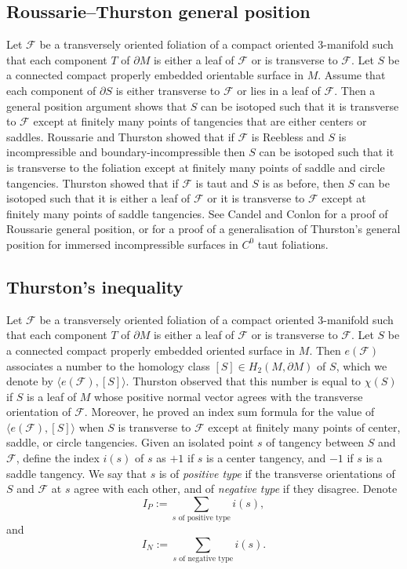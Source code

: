 \documentclass[11pt]{amsart}
\theoremstyle{remark}
\theoremstyle{definition}
\begin{document}
	\subsection{Roussarie--Thurston general position}
	Let $\mathcal{F}$ be a transversely oriented foliation of a compact oriented 3-manifold such that each component $T$ of $\partial M$ is either a leaf of $\mathcal{F}$ or is transverse to $\mathcal{F}$. Let $S$ be a connected compact properly embedded orientable surface in $M$. Assume that each component of $\partial S$ is either transverse to $\mathcal{F}$ or lies in a leaf of $\mathcal{F}$. Then a general position argument shows that $S$ can be isotoped such that it is transverse to $\mathcal{F}$ except at finitely many points of tangencies that are either centers or saddles. Roussarie \cite{roussarie1974plongements} and Thurston \cite{thurston1986norm} showed that if $\mathcal{F}$ is Reebless and $S$ is incompressible and boundary-incompressible then $S$ can be isotoped such that it is transverse to the foliation except at finitely many points of saddle and circle tangencies. Thurston showed \cite{thurston1986norm} that if $\mathcal{F}$ is taut and $S$ is as before, then $S$ can be isotoped such that it is either a leaf of $\mathcal{F}$ or it is transverse to $\mathcal{F}$ except at finitely many points of saddle tangencies. See Candel and Conlon \cite{candel2003foliations} for a proof of Roussarie general position, or \cite{gabai2000combinatorial} for a proof of a generalisation of Thurston's general position for immersed incompressible surfaces in $C^0$ taut foliations. 
	
	\subsection{Thurston's inequality}
	
	Let $\mathcal{F}$ be a transversely oriented foliation of a compact oriented 3-manifold such that each component $T$ of $\partial M$ is either a leaf of $\mathcal{F}$ or is transverse to $\mathcal{F}$. Let $S$ be a connected compact properly embedded oriented surface in $M$. Then $e(\mathcal{F})$ associates a number to the homology class $[S] \in H_2(M , \partial M)$ of $S$, which we denote by $\langle e(\mathcal{F}) , [S] \rangle$. Thurston observed that this number is equal to $\chi(S)$ if $S$ is a leaf of $M$ whose positive normal vector agrees with the transverse orientation of $\mathcal{F}$. Moreover, he proved an index sum formula for the value of $\langle e(\mathcal{F}) , [S] \rangle$ when $S$ is transverse to $\mathcal{F}$ except at finitely many points of center, saddle, or circle tangencies. Given an isolated point $s$ of tangency between $S$ and $\mathcal{F}$, define the index $i(s)$ of $s$ as $+1$ if $s$ is a center tangency, and $-1$ if $s$ is a saddle tangency. We say that $s$ is of \emph{positive type} if the transverse orientations of $S$ and $\mathcal{F}$ at $s$ agree with each other, and of \emph{negative type} if they disagree. Denote 
	\[ I_P :=  \sum_{s \text{ of positive type}} i(s), \]
	and 
	\[ I_N := \sum_{s \text{ of negative type}} i(s). \]
	
\end{document}
